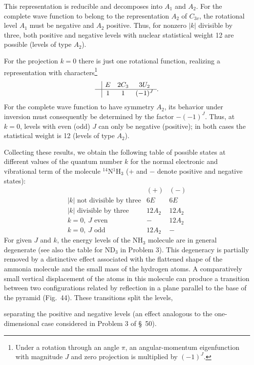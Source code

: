This representation is reducible and decomposes into $A_1$ and $A_2$. For the complete wave function to belong to the representation $A_2$ of $C_{3v}$, the rotational level $A_1$ must be negative and $A_2$ positive. Thus, for nonzero $|k|$ divisible by three, both positive and negative levels with nuclear statistical weight 12 are possible (levels of type $A_2$).

For the projection $k=0$ there is just one rotational function, realizing a representation with characters\footnote{Under a rotation through an angle $\pi$, an angular-momentum eigenfunction with magnitude $J$ and zero projection is multiplied by $(-1)^J$.}
\[
\begin{array}{c|ccc}&E&2C_3&3U_2\\\hline&1&1&(-1)^J\end{array}.
\]
For the complete wave function to have symmetry $A_2$, its behavior under inversion must consequently be determined by the factor $-(-1)^J$. Thus, at $k=0$, levels with even (odd) $J$ can only be negative (positive); in both cases the statistical weight is 12 (levels of type $A_2$).

Collecting these results, we obtain the following table of possible states at different values of the quantum number $k$ for the normal electronic and vibrational term of the molecule ${}^{14}\mathrm N{}^1\mathrm H_3$ ($+$ and $-$ denote positive and negative states):
\[
\begin{array}{l|cc}
 & (+)&(-)\\\hline
|k|\text{ not divisible by three}&6E&6E\\
|k|\text{ divisible by three}&12A_2&12A_2\\
k=0,\ J\text{ even}&-&12A_2\\
k=0,\ J\text{ odd}&12A_2&-
\end{array}
\]
For given $J$ and $k$, the energy levels of the $\mathrm{NH}_3$ molecule are in general degenerate (see also the table for $\mathrm{ND}_3$ in Problem 3). This degeneracy is partially removed by a distinctive effect associated with the flattened shape of the ammonia molecule and the small mass of the hydrogen atoms. A comparatively small vertical displacement of the atoms in this molecule can produce a transition between two configurations related by reflection in a plane parallel to the base of the pyramid (Fig.~44). These transitions split the levels,

separating the positive and negative levels (an effect analogous to the one-dimensional case considered in Problem 3 of \S~50).

